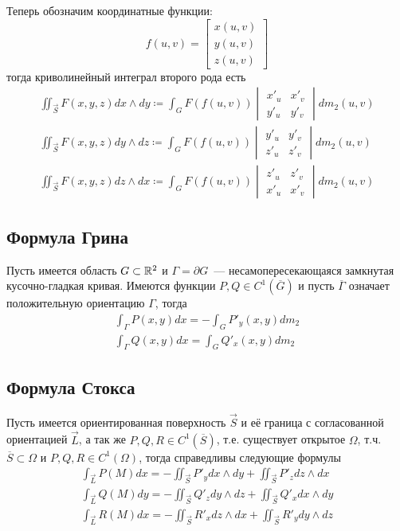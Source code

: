 \documentclass[main]{subfiles}
\begin{document}
Теперь обозначим координатные функции:
\[f(u, v) = \begin{bmatrix}
        x(u, v) \\
        y(u, v) \\
        z(u, v)
    \end{bmatrix}\]
тогда криволинейный интеграл второго рода есть
\begin{gather*}
    \iint_{\overrightarrow{S}} F(x, y, z) dx \wedge dy \coloneq \int_G F(f(u, v)) \begin{vmatrix}
        x'_u & x'_v \\
        y'_u & y'_v
    \end{vmatrix} dm_2(u, v) \\
    \iint_{\overrightarrow{S}} F(x, y, z) dy \wedge dz \coloneq \int_G F(f(u, v)) \begin{vmatrix}
        y'_u & y'_v \\
        z'_u & z'_v
    \end{vmatrix} dm_2(u, v) \\
    \iint_{\overrightarrow{S}} F(x, y, z) dz \wedge dx \coloneq \int_G F(f(u, v)) \begin{vmatrix}
        z'_u & z'_v \\
        x'_u & x'_v
    \end{vmatrix} dm_2(u, v)
\end{gather*}

\subsection{Формула Грина}
Пусть имеется область $G \subset \mathbb{R}^2$ и $\Gamma = \partial G$~--- несамопересекающаяся замкнутая кусочно-гладкая кривая.
Имеются функции $P, Q \in C^1(\overline{G})$ и пусть $\overline{\Gamma}$ означает положительную ориентацию $\Gamma$, тогда
\begin{gather*}
    \int_{\Gamma} P(x, y)dx = - \int_G P'_y (x,y) dm_2 \\
    \int_{\Gamma} Q(x, y)dx =  \int_G Q'_x (x,y) dm_2
\end{gather*}

\subsection{Формула Стокса}
Пусть имеется ориентированная поверхность $\overrightarrow{S}$ и её граница с согласованной ориентацией $\overrightarrow{L}$, а так же $P, Q, R \in C^1 (\overline{S})$, т.е. существует открытое $\Omega$, т.ч. $\overline{S} \subset \Omega$ и $P, Q, R \in C^1(\Omega)$, тогда справедливы следующие формулы
\begin{gather*}
    \int_{\overrightarrow{L}} P(M) dx = - \iint_{\overrightarrow{S}} P'_y dx \wedge dy + \iint_{\overrightarrow{S}} P'_z dz \wedge dx \\
    \int_{\overrightarrow{L}} Q(M) dy = - \iint_{\overrightarrow{S}} Q'_z dy \wedge dz + \iint_{\overrightarrow{S}} Q'_x dx \wedge dy \\
    \int_{\overrightarrow{L}} R(M) dx = - \iint_{\overrightarrow{S}} R'_x dz \wedge dx + \iint_{\overrightarrow{S}} R'_y dy \wedge dz
\end{gather*}
\end{document}
